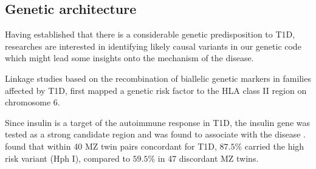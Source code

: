




\subsection{Genetic architecture}

Having established that there is a considerable genetic predisposition to T1D, researches are interested in identifying likely causal variants in our genetic code which might lead
some insights onto the mechanism of the disease.

Linkage studies based on the recombination of biallelic genetic markers in families affected by T1D,
first mapped a genetic risk factor to the HLA class II region on chromosome 6.

Since insulin is a target of the autoimmune response in T1D, the insulin gene  was tested as a strong candidate region and was found to associate with
the disease \citep{Metcalfe:2001}. 
\citet{Metcalfe:2001} found that within 40 \gls{MZ} twin pairs concordant for T1D, $87.5\%$ carried the high risk  variant (Hph I),
compared to $59.5\%$ in 47 discordant MZ twins.


